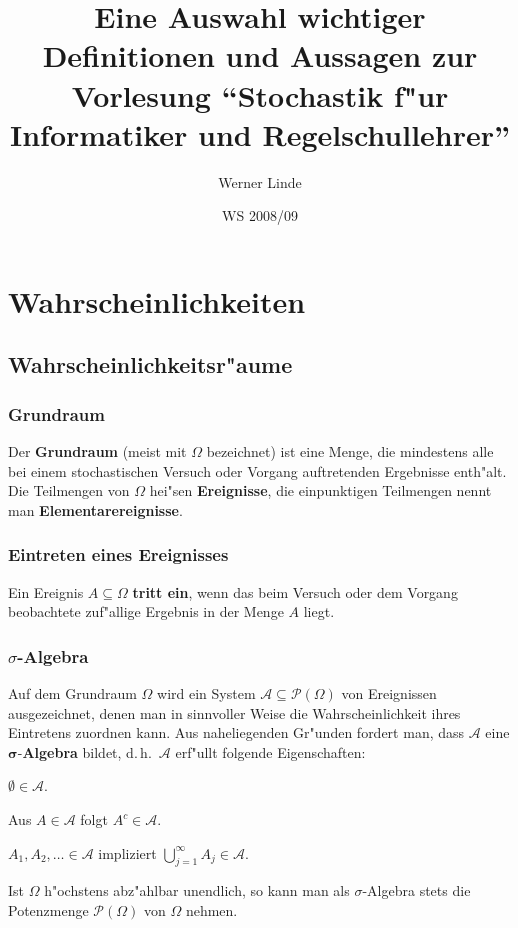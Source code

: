 \documentclass[ngerman,draft,parskip=half,twoside]{scrartcl}
\newcommand*{\Algeb}{\mathcal{A}}   %
\newcommand*{\PotM}{\mathcal{P}}    %
\begin{document}
\title{Eine Auswahl wichtiger Definitionen und Aussagen
 zur Vorlesung
  \enquote{Stochastik f"ur Informatiker und Regelschullehrer}}
\date{WS 2008/09}
\author{Werner Linde}
\maketitle

\section{Wahrscheinlichkeiten}
\subsection{Wahrscheinlichkeitsr"aume}

\subsubsection{Grundraum}
Der \textbf{Grundraum} (meist mit $\Omega$ bezeichnet) ist eine Menge,
die mindestens alle bei einem stochastischen Versuch oder Vorgang
auftretenden Ergebnisse enth"alt. Die Teilmengen von $\Omega$ hei"sen \textbf{Ereignisse},
die einpunktigen Teilmengen nennt man \textbf{Elementarereignisse}.

\subsubsection{Eintreten eines Ereignisses}
Ein Ereignis $A\subseteq \Omega$ \textbf{tritt ein}, wenn das beim Versuch oder dem Vorgang
beobachtete zuf"allige Ergebnis in der Menge
$A$ liegt.

\subsubsection{$\sigma$-Algebra}
Auf dem Grundraum $\Omega$ wird ein System $\Algeb\subseteq \PotM(\Omega)$  von Ereignissen
ausgezeichnet, denen man in sinnvoller Weise die
Wahrscheinlichkeit ihres Eintretens zuordnen kann. Aus naheliegenden Gr"unden fordert man,
dass $\Algeb$ eine $\mathbf \sigma$-\textbf{Algebra} bildet, d.\,h.~$\Algeb$ erf"ullt
folgende Eigenschaften:
\begin{eigenschaften}
 \item $\emptyset\in\Algeb$.
 \item Aus $A\in\Algeb$ folgt $A^c\in \Algeb$.
 \item $A_1,A_2,\ldots\in \Algeb$ impliziert $\bigcup_{j=1}^\infty A_j\in\Algeb$.
\end{eigenschaften}
Ist $\Omega$ h"ochstens abz"ahlbar unendlich, so kann man als $\sigma$-Algebra stets die
Potenzmenge $\PotM(\Omega)$ von $\Omega$ nehmen.
\end{document}
